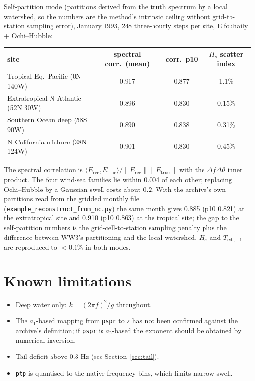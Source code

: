 \documentclass[11pt,a4paper]{article}
\newcommand{\Hs}{H_s}
\begin{document}
Self-partition mode (partitions derived from the truth spectrum by a local watershed, so the numbers
are the method's intrinsic ceiling without grid-to-station sampling error), January 1993,
248 three-hourly steps per site, Elfouhaily + Ochi--Hubble:
\begin{center}
\begin{tabular}{lccc}
\toprule
site & spectral corr.\ (mean) & corr.\ p10 & $\Hs$ scatter index\\
\midrule
Tropical Eq.\ Pacific (0N 140W) & 0.917 & 0.877 & 1.1\%\\
Extratropical N Atlantic (52N 30W) & 0.896 & 0.830 & 0.15\%\\
Southern Ocean deep (58S 90W) & 0.890 & 0.838 & 0.31\%\\
N California offshore (38N 124W) & 0.901 & 0.830 & 0.45\%\\
\bottomrule
\end{tabular}
\end{center}
The spectral correlation is $\langle E_{\mathrm{rec}},E_{\mathrm{true}}\rangle/\|E_{\mathrm{rec}}\|\|E_{\mathrm{true}}\|$
with the $\Delta f\Delta\theta$ inner product. The four wind-sea families lie within 0.004 of each
other; replacing Ochi--Hubble by a Gaussian swell costs about 0.2. With the archive's own partitions read from the gridded monthly file
(\texttt{example\_reconstruct\_from\_nc.py}) the same month gives 0.885 (p10 0.821) at the
extratropical site and 0.910 (p10 0.863) at the tropical site; the gap to the self-partition numbers
is the grid-cell-to-station sampling penalty plus the difference between WW3's partitioning and the
local watershed. $\Hs$ and $T_{m0,-1}$ are reproduced to $<0.1\%$ in both modes.

\section{Known limitations}
\begin{itemize}\itemsep2pt
\item Deep water only: $k=(2\pi f)^2/g$ throughout.
\item The $a_1$-based mapping from \texttt{pspr} to $s$ has not been confirmed against the archive's
definition; if \texttt{pspr} is $a_2$-based the exponent should be obtained by numerical inversion.
\item Tail deficit above 0.3 Hz (see Section~\ref{sec:tail}).
\item \texttt{ptp} is quantised to the native frequency bins, which limits narrow swell.
\end{itemize}
\end{document}
